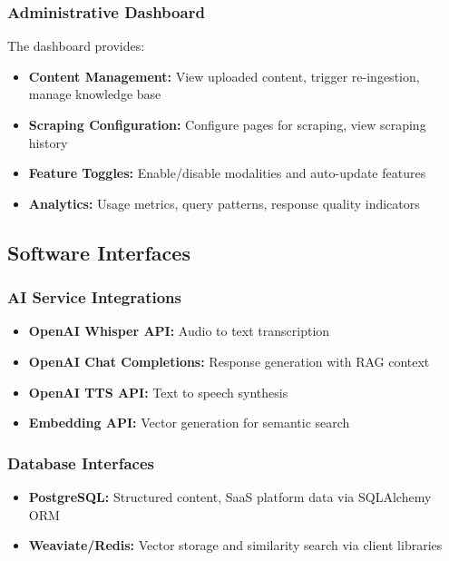 \subsubsection{Administrative Dashboard}

The dashboard provides:
\begin{itemize}[leftmargin=*]
    \item \textbf{Content Management:} View uploaded content, trigger re-ingestion, manage knowledge base
    \item \textbf{Scraping Configuration:} Configure pages for scraping, view scraping history
    \item \textbf{Feature Toggles:} Enable/disable modalities and auto-update features
    \item \textbf{Analytics:} Usage metrics, query patterns, response quality indicators
\end{itemize}

\subsection{Software Interfaces}

\subsubsection{AI Service Integrations}

\begin{itemize}[leftmargin=*]
    \item \textbf{OpenAI Whisper API:} Audio to text transcription
    \item \textbf{OpenAI Chat Completions:} Response generation with RAG context
    \item \textbf{OpenAI TTS API:} Text to speech synthesis
    \item \textbf{Embedding API:} Vector generation for semantic search
\end{itemize}

\subsubsection{Database Interfaces}

\begin{itemize}[leftmargin=*]
    \item \textbf{PostgreSQL:} Structured content, SaaS platform data via SQLAlchemy ORM
    \item \textbf{Weaviate/Redis:} Vector storage and similarity search via client libraries
\end{itemize}

